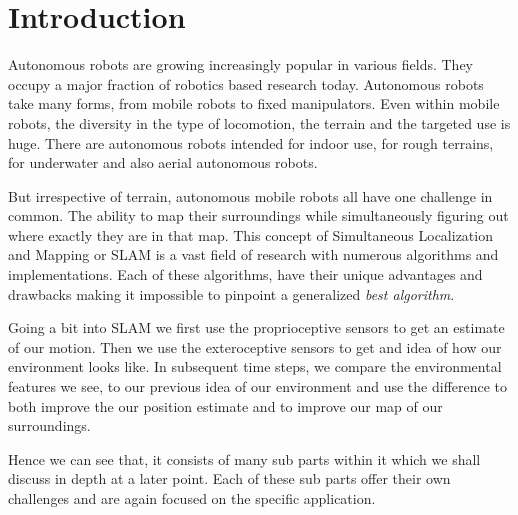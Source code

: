 \chapter{Introduction}

	Autonomous robots are growing increasingly popular in various fields. They occupy a major fraction of robotics based research today. Autonomous robots take many forms, from mobile robots to fixed manipulators. Even within mobile robots, the diversity in the type of locomotion, the terrain and the targeted use is huge. There are autonomous robots intended for indoor use, for rough terrains, for underwater and also aerial autonomous robots. 
	
	But irrespective of terrain, autonomous mobile robots all have one challenge in common. The ability to map their surroundings while simultaneously figuring out where exactly they are in that map. This concept of Simultaneous Localization and Mapping or SLAM is a vast field of research with numerous algorithms and implementations. Each of these algorithms, have their unique advantages and drawbacks making it impossible to pinpoint a generalized \textit{best algorithm}. 
	
	Going a bit into SLAM we first use the proprioceptive sensors to get an estimate of our motion. Then we use the exteroceptive sensors to get and idea of how our environment looks like. In subsequent time steps, we compare the environmental features we see, to our previous idea of our environment and use the difference to both improve the our position estimate and to improve our map of our surroundings.
	 
	Hence we can see that, it consists of many sub parts within it which we shall discuss in depth at a later point. Each of these sub parts offer their own challenges and are again focused on the specific application.